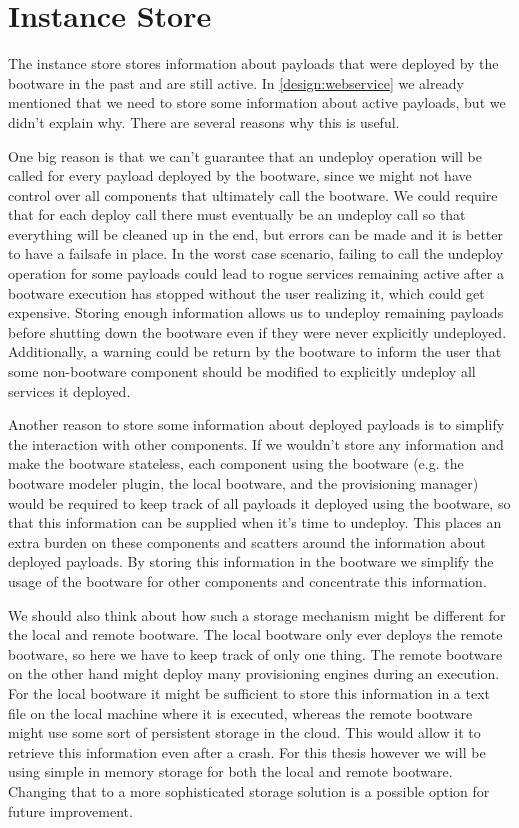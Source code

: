 \section{Instance Store}
\label{design:instancestore}

The instance store stores information about payloads that were deployed by the bootware in the past and are still active.
In \autoref{design:webservice} we already mentioned that we need to store some information about active payloads, but we didn't explain why.
There are several reasons why this is useful.

One big reason is that we can't guarantee that an undeploy operation will be called for every payload deployed by the bootware, since we might not have control over all components that ultimately call the bootware.
We could require that for each deploy call there must eventually be an undeploy call so that everything will be cleaned up in the end, but errors can be made and it is better to have a failsafe in place.
In the worst case scenario, failing to call the undeploy operation for some payloads could lead to rogue services remaining active after a bootware execution has stopped without the user realizing it, which could get expensive.
Storing enough information allows us to undeploy remaining payloads before shutting down the bootware even if they were never explicitly undeployed.
Additionally, a warning could be return by the bootware to inform the user that some non-bootware component should be modified to explicitly undeploy all services it deployed.

Another reason to store some information about deployed payloads is to simplify the interaction with other components.
If we wouldn't store any information and make the bootware stateless, each component using the bootware (e.g. the bootware modeler plugin, the local bootware, and the provisioning manager) would be required to keep track of all payloads it deployed using the bootware, so that this information can be supplied when it's time to undeploy.
This places an extra burden on these components and scatters around the information about deployed payloads.
By storing this information in the bootware we simplify the usage of the bootware for other components and concentrate this information.

We should also think about how such a storage mechanism might be different for the local and remote bootware.
The local bootware only ever deploys the remote bootware, so here we have to keep track of only one thing.
The remote bootware on the other hand might deploy many provisioning engines during an execution.
For the local bootware it might be sufficient to store this information in a text file on the local machine where it is executed, whereas the remote bootware might use some sort of persistent storage in the cloud.
This would allow it to retrieve this information even after a crash.
For this thesis however we will be using simple in memory storage for both the local and remote bootware.
Changing that to a more sophisticated storage solution is a possible option for future improvement.

